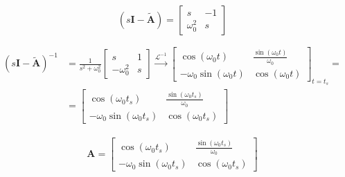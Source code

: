 \documentclass[12pt,a4paper,oneside]{book}
\begin{document}
\begin{onehalfspace}
\begin{example}
	\begin{equation}
		\left(s\mathbf{I}-\tilde{\mathbf{A}} \right) = 
		\left[ \begin{matrix}
			s & -1 \\[6pt]
			\omega_0^2 & s
		\end{matrix}\right]
	\end{equation}
	
	\begin{equation}
		\begin{aligned}
			\left(s\mathbf{I}-\tilde{\mathbf{A}} \right)^{-1} &= 
			\frac{1}{s^2+\omega_0^2}\left[ \begin{matrix}
				s & 1 \\[6pt]
				-\omega_0^2 & s
			\end{matrix}\right] \xrightarrow{\mathcal{L}^{-1}} 
			\left[ 
			\begin{matrix}
				\cos(\omega_0t) & \frac{\sin(\omega_0t)}{\omega_0} \\[8pt]
				-\omega_0 \sin(\omega_0t) & \cos(\omega_0t)
			\end{matrix}
			\right]_{t=t_s} = \\[12pt]
			& = \left[ 
			\begin{matrix}
				\cos(\omega_0t_s) & \frac{\sin(\omega_0t_s)}{\omega_0} \\[8pt]
				-\omega_0 \sin(\omega_0t_s) & \cos(\omega_0t_s)
			\end{matrix}
			\right]
		\end{aligned}
	\end{equation}
	
	\begin{equation}
		\begin{aligned}
			\mathbf{A} =\left[ 
			\begin{matrix}
				\cos(\omega_0t_s) & \frac{\sin(\omega_0t_s)}{\omega_0} \\[8pt]
				-\omega_0 \sin(\omega_0t_s) & \cos(\omega_0t_s)
			\end{matrix}
			\right]
		\end{aligned}
	\end{equation}
	

\end{example}
\end{onehalfspace}
\end{document}
